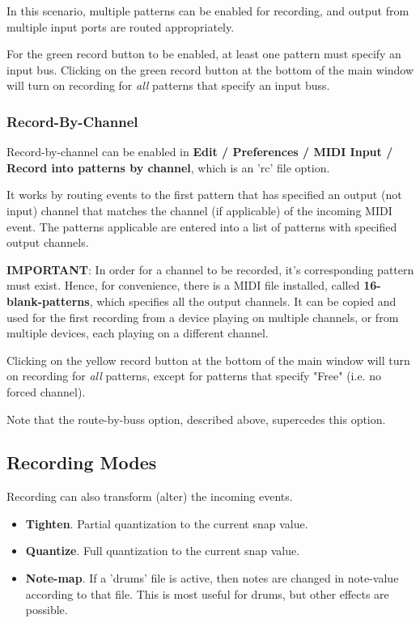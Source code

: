    In this scenario, multiple patterns can be enabled for recording,
   and output from multiple input ports are routed appropriately.

   For the green record button to be enabled, at least one pattern
   must specify an input bus.
   Clicking on the green record button at the bottom of the main window
   will turn on recording for \textsl{all}
   patterns that specify an input buss.

\subsubsection{Record-By-Channel}
\label{subsubsec:recording_record_by_channel}

   Record-by-channel can be enabled in
   \textbf{Edit / Preferences / MIDI Input / Record into patterns by
   channel}, which is an 'rc' file option.

   It works by routing events to the first pattern that has specified an 
   output (not input) channel that matches the channel (if applicable) of
   the incoming MIDI event.
   The patterns applicable are entered into a list of patterns with specified
   output channels.

   \textbf{IMPORTANT}:
   In order for a channel to be recorded, it's corresponding pattern
   must exist. Hence,
   for convenience, there is a MIDI file installed, called
   \textbf{16-blank-patterns}, which specifies all the output channels.
   It can be copied and used for the first recording from a device
   playing on multiple channels, or from multiple devices, each playing
   on a different channel.

   Clicking on the yellow record button at the bottom of the main window
   will turn on recording for \textsl{all}
   patterns, except for patterns that specify "Free" (i.e. no forced channel).

   Note that the route-by-buss option, described above, supercedes this
   option.

\subsection{Recording Modes}
\label{sec:recording_modes}

   Recording can also transform (alter) the incoming events.

   \begin{itemize}
      \item \textbf{Tighten}.
         Partial quantization to the current snap value.
      \item \textbf{Quantize}.
         Full quantization to the current snap value.
      \item \textbf{Note-map}.
         If a 'drums' file is active, then notes are changed
         in note-value according to that file.
         This is most useful for drums, but other effects are possible.
   \end{itemize}

